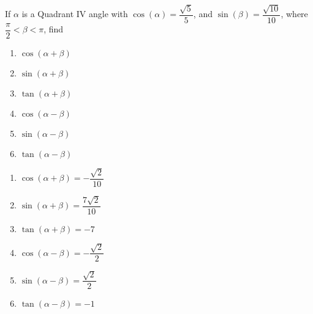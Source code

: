 {If $\alpha$ is a Quadrant IV angle with $\cos(\alpha) = \dfrac{\sqrt{5}}{5}$, and  $\sin(\beta) = \dfrac{\sqrt{10}}{10}$, where $\dfrac{\pi}{2} < \beta < \pi$, find

\begin{multicols}{2}

\begin{enumerate}

\item  $\cos(\alpha + \beta)$
\item  $\sin(\alpha + \beta)$
\item  $\tan(\alpha + \beta)$
\item  $\cos(\alpha - \beta)$
\item  $\sin(\alpha - \beta)$
\item  $\tan(\alpha - \beta)$

\end{enumerate}

\end{multicols}}
{\begin{multicols}{2}

\begin{enumerate}

\item  $\cos(\alpha + \beta) = -\dfrac{\sqrt{2}}{10}$
\item  $\sin(\alpha + \beta) = \dfrac{7\sqrt{2}}{10}$
\item  $\tan(\alpha + \beta) = -7$ 
\item  $\cos(\alpha - \beta)= -\dfrac{\sqrt{2}}{2}$
\item  $\sin(\alpha - \beta) = \dfrac{\sqrt{2}}{2}$
\item  $\tan(\alpha - \beta) = -1$ 

\end{enumerate}

\end{multicols}}